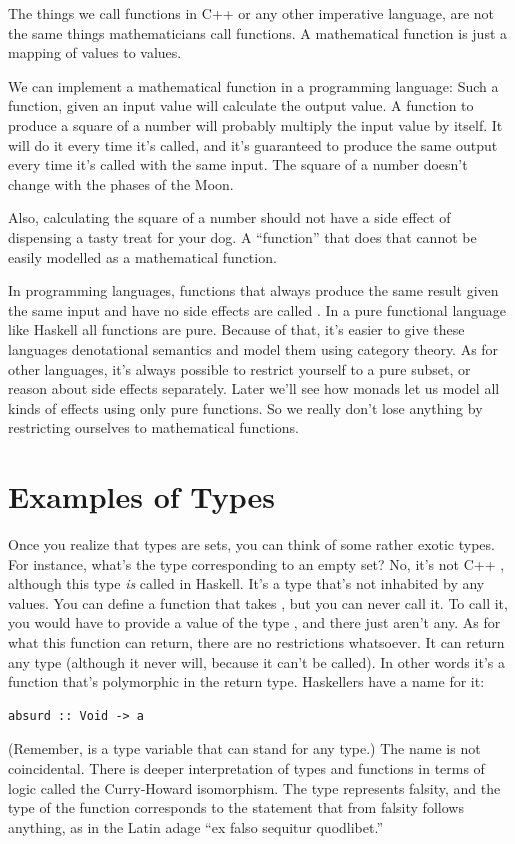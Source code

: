 The things we call functions in C++ or any other imperative language,
are not the same things mathematicians call functions. A mathematical
function is just a mapping of values to values.

We can implement a mathematical function in a programming language: Such
a function, given an input value will calculate the output value. A
function to produce a square of a number will probably multiply the
input value by itself. It will do it every time it's called, and it's
guaranteed to produce the same output every time it's called with the
same input. The square of a number doesn't change with the phases of the
Moon.

Also, calculating the square of a number should not have a side effect
of dispensing a tasty treat for your dog. A ``function'' that does that
cannot be easily modelled as a mathematical function.

In programming languages, functions that always produce the same result
given the same input and have no side effects are called . In a pure functional language like Haskell all functions are
pure. Because of that, it's easier to give these languages denotational
semantics and model them using category theory. As for other languages,
it's always possible to restrict yourself to a pure subset, or reason
about side effects separately. Later we'll see how monads let us model
all kinds of effects using only pure functions. So we really don't lose
anything by restricting ourselves to mathematical functions.

\section{Examples of Types}

Once you realize that types are sets, you can think of some rather
exotic types. For instance, what's the type corresponding to an empty
set? No, it's not C++ , although this type \emph{is} called
 in Haskell. It's a type that's not inhabited by any
values. You can define a function that takes , but you can
never call it. To call it, you would have to provide a value of the type
, and there just aren't any. As for what this function can
return, there are no restrictions whatsoever. It can return any type
(although it never will, because it can't be called). In other words
it's a function that's polymorphic in the return type. Haskellers have a
name for it:

\begin{Verbatim}
absurd :: Void -> a
\end{Verbatim}
(Remember,  is a type variable that can stand for any type.)
The name is not coincidental. There is deeper interpretation of types
and functions in terms of logic called the Curry-Howard isomorphism. The
type  represents falsity, and the type of the function
 corresponds to the statement that from falsity follows
anything, as in the Latin adage ``ex falso sequitur quodlibet.''

